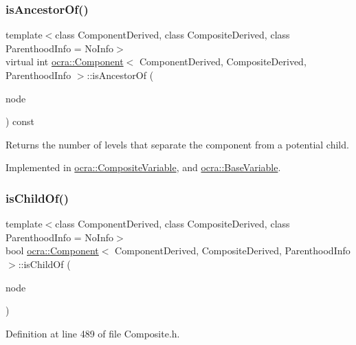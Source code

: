 \subsubsection{\texorpdfstring{is\+Ancestor\+Of()}{isAncestorOf()}}
{\footnotesize\ttfamily template$<$class Component\+Derived, class Composite\+Derived, class Parenthood\+Info = No\+Info$>$ \\
virtual int \hyperlink{classocra_1_1Component}{ocra\+::\+Component}$<$ Component\+Derived, Composite\+Derived, Parenthood\+Info $>$\+::is\+Ancestor\+Of (\begin{DoxyParamCaption}\item[{const Component\+Derived \&}]{node }\end{DoxyParamCaption}) const\hspace{0.3cm}{\ttfamily [pure virtual]}}



Returns the number of levels that separate the component from a potential child. 



Implemented in \hyperlink{classocra_1_1CompositeVariable_a6601ac71bdd683d06a7a6bfe4fa7252c}{ocra\+::\+Composite\+Variable}, and \hyperlink{classocra_1_1BaseVariable_a66d07236f4d060273f3f46632dc851ac}{ocra\+::\+Base\+Variable}.

\hypertarget{classocra_1_1Component_a77448d773b20fda6d8349d20691a8840}{}\label{classocra_1_1Component_a77448d773b20fda6d8349d20691a8840} 
\subsubsection{\texorpdfstring{is\+Child\+Of()}{isChildOf()}}
{\footnotesize\ttfamily template$<$class Component\+Derived, class Composite\+Derived, class Parenthood\+Info = No\+Info$>$ \\
bool \hyperlink{classocra_1_1Component}{ocra\+::\+Component}$<$ Component\+Derived, Composite\+Derived, Parenthood\+Info $>$\+::is\+Child\+Of (\begin{DoxyParamCaption}\item[{const Composite\+Derived \&}]{node }\end{DoxyParamCaption})\hspace{0.3cm}{\ttfamily [inline]}}



Definition at line 489 of file Composite.\+h.

